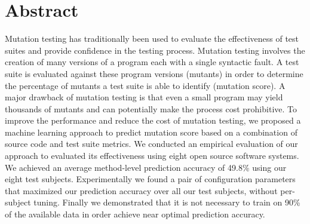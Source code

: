 \chapter*{Abstract}
Mutation testing has traditionally been used to evaluate the effectiveness of test suites and provide confidence in the testing process. Mutation testing involves the creation of many versions of a program each with a single syntactic fault. A test suite is evaluated against these program versions (mutants) in order to determine the percentage of mutants a test suite is able to identify (mutation score). A major drawback of mutation testing is that even a small program may yield thousands of mutants and can potentially make the process cost prohibitive. To improve the performance and reduce the cost of mutation testing, we proposed a machine learning approach to predict mutation score based on a combination of source code and test suite metrics. We conducted an empirical evaluation of our approach to evaluated its effectiveness using eight open source software systems. We achieved an average method-level prediction accuracy of 49.8\% using our eight test subjects. Experimentally we found a pair of configuration parameters that maximized our prediction accuracy over all our test subjects, without per-subject tuning. Finally we demonstrated that it is not necessary to train on 90\% of the available data in order achieve near optimal prediction accuracy.
